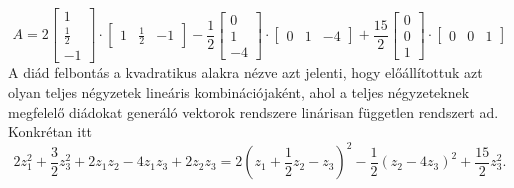 \documentclass[9pt, a4paper, showtrims]{memoir}
\theoremstyle{plain}
\theoremstyle{remark}
\theoremstyle{definition}
\begin{document}
\[
    A
    =
    2
    \begin{bmatrix}
    1\\ \frac{1}{2}\\ -1
    \end{bmatrix}
    \cdot
    \begin{bmatrix}
    1& \frac{1}{2}& -1
    \end{bmatrix}
    -\frac{1}{2}
    \begin{bmatrix}
        0\\1\\-4
    \end{bmatrix}
    \cdot
    \begin{bmatrix}
        0&1&-4
    \end{bmatrix}
    +
    \frac{15}{2}
    \begin{bmatrix}
        0\\0\\1
    \end{bmatrix}
    \cdot
    \begin{bmatrix}
        0&0&1
    \end{bmatrix}
\]
A diád felbontás a kvadratikus alakra nézve azt jelenti, 
hogy előállítottuk azt olyan teljes négyzetek lineáris kombinációjaként,
ahol a teljes négyzeteknek megfelelő diádokat generáló vektorok rendszere linárisan független rendszert ad.
Konkrétan itt
\[
    2z_1^2+\frac{3}{2}z_3^2+2z_1z_2-4z_1z_3+2z_2z_3
    =
    2\left( z_1+\frac{1}{2}z_2-z_3 \right)^2
    -\frac{1}{2}\left( z_2-4z_3 \right)^2
    +\frac{15}{2}z_3^2.
\]
\end{document}

